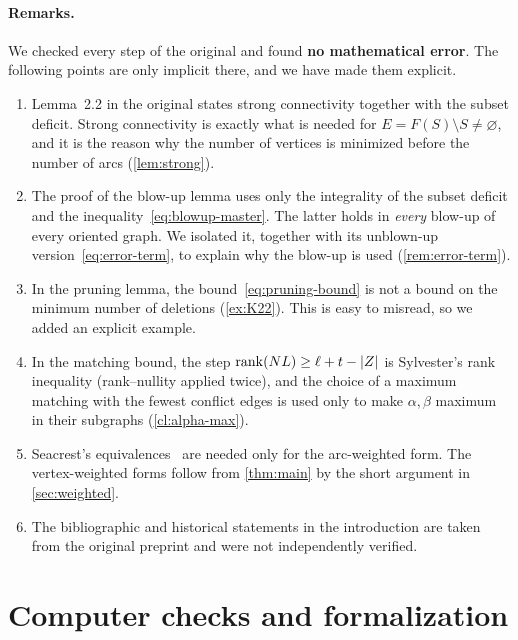 \paragraph{Remarks.}
We checked every step of the original and found \textbf{no mathematical
error}. The following points are only implicit there, and we have made them
explicit.
\begin{enumerate}[leftmargin=*]
\item Lemma~2.2 in the original states strong connectivity together with
the subset deficit. Strong connectivity is exactly what is needed for
$E=F(S)\setminus S\ne\varnothing$, and it is the reason why the number of
vertices is minimized before the number of arcs (\cref{lem:strong}).
\item The proof of the blow-up lemma uses only the integrality of the
subset deficit and the inequality~\eqref{eq:blowup-master}. The latter holds
in \emph{every} blow-up of every oriented graph. We isolated it, together
with its unblown-up version~\eqref{eq:error-term}, to explain why the
blow-up is used (\cref{rem:error-term}).
\item In the pruning lemma, the bound~\eqref{eq:pruning-bound} is not a
bound on the minimum number of deletions (\cref{ex:K22}). This is easy to
misread, so we added an explicit example.
\item In the matching bound, the step $\operatorname{rank}(NL)\ge\ell+t-\lvert Z\rvert$ is Sylvester's
rank inequality (rank--nullity applied twice), and the choice of a maximum matching with the fewest
conflict edges is used only to make $\alpha,\beta$ maximum in their
subgraphs (\cref{cl:alpha-max}).
\item Seacrest's equivalences~\cite{Seacrest2015} are needed only for the
arc-weighted form. The vertex-weighted forms follow from \cref{thm:main}
by the short argument in \cref{sec:weighted}.
\item The bibliographic and historical statements in the introduction are
taken from the original preprint and were not independently verified.
\end{enumerate}

\section{Computer checks and formalization}\label{app:checks}

\sloppy
